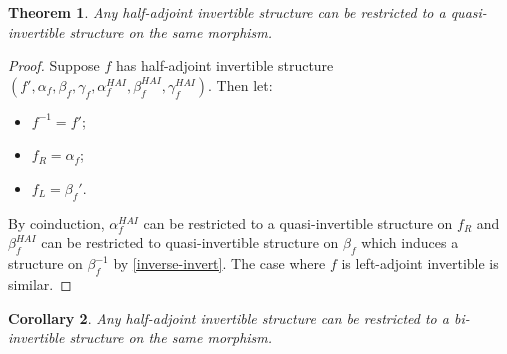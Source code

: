 \documentclass[draft]{article}
\newtheorem{theorem}{Theorem} \newtheorem{prop}[theorem]{Proposition}
\newtheorem{cor}[theorem]{Corollary}
\newcommand{\inv}[1]{#1^{-1}} \newcommand{\comp}{\star}
\begin{document}
\begin{theorem}
  Any half-adjoint invertible structure can be restricted to a
  quasi-invertible structure on the same morphism.
\end{theorem}
\begin{proof}
  Suppose \(f\) has half-adjoint invertible structure \((f',
  \alpha_f, \beta_f, \gamma_f, \alpha_f^{HAI}, \beta_f^{HAI},
  \gamma_f^{HAI})\). Then let:
  \begin{itemize}
  \item \(\inv f = {f'}\);
  \item \(f_R = \alpha_f\);
  \item \(f_L = \beta_f'\).
  \end{itemize}
  By coinduction, \(\alpha_f^{HAI}\) can be restricted to a
  quasi-invertible structure on \(f_R\) and \(\beta_f^{HAI}\) can be
  restricted to quasi-invertible structure on \(\beta_f\) which
  induces a structure on \(\inv {\beta_f}\) by \cref{inverse-invert}.
  The case where \(f\) is left-adjoint invertible is similar.
\end{proof}

\begin{cor}
  Any half-adjoint invertible structure can be restricted to a
  bi-invertible structure on the same morphism.
\end{cor}
\end{document}
